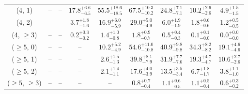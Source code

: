 \begin{table}[h!]
{\begin{tabular}{ccccccccc}
	(4, 1) & -- & -- & $17.8^{+ 6.6 }_{- 6.5 }$ & $55.5^{+ 18.6 }_{- 18.5 }$ & $67.5^{+ 10.3 }_{- 10.2 }$ & $24.8^{+ 7.1 }_{- 7.1 }$ & $10.2^{+ 2.6 }_{- 2.6 }$ & $4.9^{+ 1.5 }_{- 1.5 }$ \\[0.5ex] 
	(4, 2) & -- & -- & $3.7^{+ 1.8 }_{- 1.6 }$ & $16.9^{+ 6.0 }_{- 5.9 }$ & $29.0^{+ 5.0 }_{- 4.9 }$ & $6.0^{+ 1.9 }_{- 1.9 }$ & $1.8^{+ 0.6 }_{- 0.6 }$ & $1.2^{+ 0.5 }_{- 0.5 }$ \\[0.5ex] 
	(4, $\ge3$) & -- & -- & $0.2^{+ 0.3 }_{- 0.2 }$ & $1.4^{+ 1.0 }_{- 0.8 }$ & $1.8^{+ 0.9 }_{- 0.7 }$ & $0.5^{+ 0.4 }_{- 0.3 }$ & $0.1^{+ 0.1 }_{- 0.0 }$ & $0.0^{+ 0.0 }_{- 0.0 }$ \\[0.5ex] 
	($\ge5$, 0) & -- & -- & -- & $10.2^{+ 5.2 }_{- 4.9 }$ & $54.6^{+ 11.0 }_{- 10.8 }$ & $40.9^{+ 9.8 }_{- 9.8 }$ & $34.3^{+ 8.2 }_{- 8.2 }$ & $19.1^{+ 4.6 }_{- 4.6 }$ \\[0.5ex] 
	($\ge5$, 1) & -- & -- & -- & $2.6^{+ 1.5 }_{- 1.3 }$ & $39.8^{+ 8.1 }_{- 7.9 }$ & $31.9^{+ 7.7 }_{- 7.6 }$ & $19.3^{+ 4.7 }_{- 4.7 }$ & $10.6^{+ 2.7 }_{- 2.6 }$ \\[0.5ex] 
	($\ge5$, 2) & -- & -- & -- & $2.1^{+ 1.4 }_{- 1.1 }$ & $17.6^{+ 4.0 }_{- 3.9 }$ & $13.5^{+ 3.5 }_{- 3.4 }$ & $6.7^{+ 1.8 }_{- 1.7 }$ & $3.8^{+ 1.1 }_{- 1.0 }$ \\[0.5ex] 
	($\ge5$, $\ge3$) & -- & -- & -- & -- & $0.8^{+ 0.7 }_{- 0.4 }$ & $1.1^{+ 0.6 }_{- 0.5 }$ & $1.1^{+ 0.5 }_{- 0.4 }$ & $0.6^{+ 0.3 }_{- 0.2 }$ \\[0.5ex] 
	\hline
	\hline
\end{tabular}}
\end{table}
